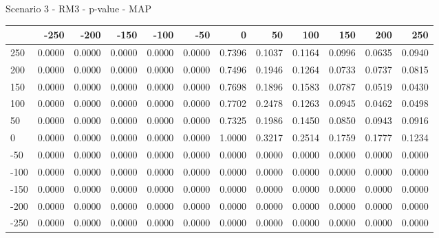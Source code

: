 Scenario 3 - RM3 - p-value - MAP
\begin{tabular}{lrrrrrrrrrrr}
\toprule
{} &   -250 &   -200 &   -150 &   -100 &   -50  &    0   &    50  &    100 &    150 &    200 &    250 \\
\midrule
 250 & 0.0000 & 0.0000 & 0.0000 & 0.0000 & 0.0000 & 0.7396 & 0.1037 & 0.1164 & 0.0996 & 0.0635 & 0.0940 \\
 200 & 0.0000 & 0.0000 & 0.0000 & 0.0000 & 0.0000 & 0.7496 & 0.1946 & 0.1264 & 0.0733 & 0.0737 & 0.0815 \\
 150 & 0.0000 & 0.0000 & 0.0000 & 0.0000 & 0.0000 & 0.7698 & 0.1896 & 0.1583 & 0.0787 & 0.0519 & 0.0430 \\
 100 & 0.0000 & 0.0000 & 0.0000 & 0.0000 & 0.0000 & 0.7702 & 0.2478 & 0.1263 & 0.0945 & 0.0462 & 0.0498 \\
 50  & 0.0000 & 0.0000 & 0.0000 & 0.0000 & 0.0000 & 0.7325 & 0.1986 & 0.1450 & 0.0850 & 0.0943 & 0.0916 \\
 0   & 0.0000 & 0.0000 & 0.0000 & 0.0000 & 0.0000 & 1.0000 & 0.3217 & 0.2514 & 0.1759 & 0.1777 & 0.1234 \\
-50  & 0.0000 & 0.0000 & 0.0000 & 0.0000 & 0.0000 & 0.0000 & 0.0000 & 0.0000 & 0.0000 & 0.0000 & 0.0000 \\
-100 & 0.0000 & 0.0000 & 0.0000 & 0.0000 & 0.0000 & 0.0000 & 0.0000 & 0.0000 & 0.0000 & 0.0000 & 0.0000 \\
-150 & 0.0000 & 0.0000 & 0.0000 & 0.0000 & 0.0000 & 0.0000 & 0.0000 & 0.0000 & 0.0000 & 0.0000 & 0.0000 \\
-200 & 0.0000 & 0.0000 & 0.0000 & 0.0000 & 0.0000 & 0.0000 & 0.0000 & 0.0000 & 0.0000 & 0.0000 & 0.0000 \\
-250 & 0.0000 & 0.0000 & 0.0000 & 0.0000 & 0.0000 & 0.0000 & 0.0000 & 0.0000 & 0.0000 & 0.0000 & 0.0000 \\
\bottomrule
\end{tabular}

